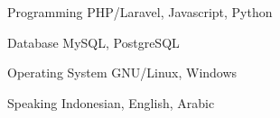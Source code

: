 


\begin{cvskills}


\cvskill
{Programming} %
{PHP/Laravel, Javascript, Python} %




\cvskill
{Database} %
{MySQL, PostgreSQL} %


\cvskill
{Operating System} %
{GNU/Linux, Windows} %


\cvskill
{Speaking} %
{Indonesian, English, Arabic} %




\end{cvskills}
